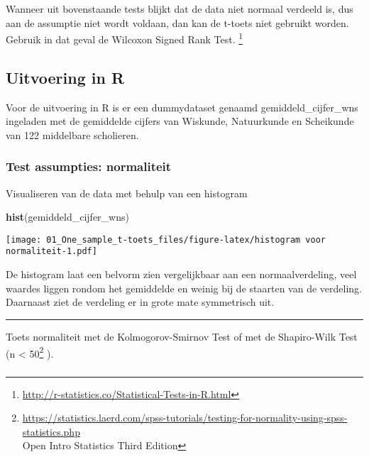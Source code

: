 \documentclass[]{article}
\newenvironment{Shaded}{\begin{snugshade}}{\end{snugshade}}
\newcommand{\KeywordTok}[1]{\textcolor[rgb]{0.13,0.29,0.53}{\textbf{#1}}}
\newcommand{\NormalTok}[1]{#1}
\let\rmarkdownfootnote\footnote%
\def\footnote{\protect\rmarkdownfootnote}
\begin{document}
Wanneer uit bovenstaande tests blijkt dat de data niet normaal verdeeld
is, dus aan de assumptie niet wordt voldaan, dan kan de t-toets niet
gebruikt worden. Gebruik in dat geval de Wilcoxon Signed Rank Test.
\footnote{\url{http://r-statistics.co/Statistical-Tests-in-R.html}}

\hypertarget{uitvoering-in-r}{%
\subsection{Uitvoering in R}\label{uitvoering-in-r}}

Voor de uitvoering in R is er een dummydataset genaamd
gemiddeld\_cijfer\_wns ingeladen met de gemiddelde cijfers van Wiskunde,
Natuurkunde en Scheikunde van 122 middelbare scholieren.

\hypertarget{test-assumpties-normaliteit}{%
\subsubsection{Test assumpties:
normaliteit}\label{test-assumpties-normaliteit}}

Visualiseren van de data met behulp van een histogram

\begin{Shaded}
\begin{Highlighting}[]
\KeywordTok{hist}\NormalTok{(gemiddeld_cijfer_wns)}
\end{Highlighting}
\end{Shaded}

\texttt{[image: 01\_One\_sample\_t-toets\_files/figure-latex/histogram voor normaliteit-1.pdf]}

De histogram laat een belvorm zien vergelijkbaar aan een
normaalverdeling, veel waardes liggen rondom het gemiddelde en weinig
bij de staarten van de verdeling. Daarnaast ziet de verdeling er in
grote mate symmetrisch uit.

\begin{center}\rule{0.5\linewidth}{\linethickness}\end{center}

Toets normaliteit met de Kolmogorov-Smirnov Test of met de Shapiro-Wilk
Test (n \textless{} 50\footnote{\url{https://statistics.laerd.com/spss-tutorials/testing-for-normality-using-spss-statistics.php}~\\
  Open Intro Statistics Third Edition} ).

\hypertarget{section}{%
\subsubsection{}\label{section}}
\end{document}

